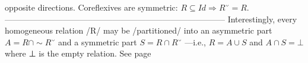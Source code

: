 \documentclass[11pt]{article}
\begin{document}
opposite directions.   \quad Coreflexives are symmetric: $R ⊆ Id ⇒ R ˘ = R$. --------------------------------------------------------------------------------  Interestingly, every homogeneous relation /R/ may be /partitioned/ into an asymmetric part $A = R ∩ ∼R˘$ and a symmetric part $S = R ∩ R˘$ ---i.e., $R = A ∪ S$ and $A ∩ S = ⊥$ where ⊥ is the empty relation. See page \pageref{org-special-block-extras-glossary-declaration-site-Symmetric}
\end{document}
